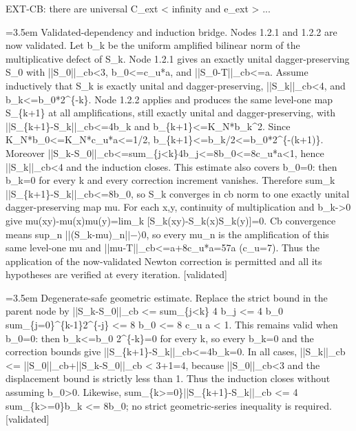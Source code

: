 \documentclass{article}
\newcommand{\step}[1]{\par\noindent\hangindent=3.5em\hangafter=1%
  \makebox[3.5em][l]{\textbf{#1.}}}
\newcommand{\steptag}[1]{\hfill{\small\textsf{[#1]}}}
\begin{document}
\begin{proofbox}{EXT-CB: there are universal C\_ext < infinity and e\_ext > ...}
\step{1.2.3.1} Validated-dependency and induction bridge. Nodes 1.2.1 and 1.2.2 are now validated. Let b\_k be the uniform amplified bilinear norm of the multiplicative defect of S\_k. Node 1.2.1 gives an exactly unital dagger-preserving S\_0 with ||S\_0||\_cb<3, b\_0<=c\_u*a, and ||S\_0-T||\_cb<=a. Assume inductively that S\_k is exactly unital and dagger-preserving, ||S\_k||\_cb<4, and b\_k<=b\_0*2\textasciicircum{}\{-k\}. Node 1.2.2 applies and produces the same level-one map S\_\{k+1\} at all amplifications, still exactly unital and dagger-preserving, with ||S\_\{k+1\}-S\_k||\_cb<=4b\_k and b\_\{k+1\}<=K\_N*b\_k\textasciicircum{}2. Since K\_N*b\_0<=K\_N*c\_u*a<=1/2, b\_\{k+1\}<=b\_k/2<=b\_0*2\textasciicircum{}\{-(k+1)\}. Moreover ||S\_k-S\_0||\_cb<=sum\_\{j<k\}4b\_j<=8b\_0<=8c\_u*a<1, hence ||S\_k||\_cb<4 and the induction closes. This estimate also covers b\_0=0: then b\_k=0 for every k and every correction increment vanishes. Therefore sum\_k ||S\_\{k+1\}-S\_k||\_cb<=8b\_0, so S\_k converges in cb norm to one exactly unital dagger-preserving map mu. For each x,y, continuity of multiplication and b\_k->0 give mu(xy)-mu(x)mu(y)=lim\_k [S\_k(xy)-S\_k(x)S\_k(y)]=0. Cb convergence means sup\_n ||(S\_k-mu)\_n|$|-\rangle$0, so every mu\_n is the amplification of this same level-one mu and ||mu-T||\_cb<=a+8c\_u*a=57a (c\_u=7). Thus the application of the now-validated Newton correction is permitted and all its hypotheses are verified at every iteration. \steptag{validated} \\[6pt]
\step{1.2.3.1.1} Degenerate-safe geometric estimate. Replace the strict bound in the parent node by ||S\_k-S\_0||\_cb <= sum\_\{j<k\} 4 b\_j <= 4 b\_0 sum\_\{j=0\}\textasciicircum{}\{k-1\}2\textasciicircum{}\{-j\} <= 8 b\_0 <= 8 c\_u a < 1. This remains valid when b\_0=0: then b\_k<=b\_0 2\textasciicircum{}\{-k\}=0 for every k, so every b\_k=0 and the correction bounds give ||S\_\{k+1\}-S\_k||\_cb<=4b\_k=0. In all cases, ||S\_k||\_cb <= ||S\_0||\_cb+||S\_k-S\_0||\_cb < 3+1=4, because ||S\_0||\_cb<3 and the displacement bound is strictly less than 1. Thus the induction closes without assuming b\_0>0. Likewise, sum\_\{k>=0\}||S\_\{k+1\}-S\_k||\_cb <= 4 sum\_\{k>=0\}b\_k <= 8b\_0; no strict geometric-series inequality is required. \steptag{validated} \\[4pt]

\end{proofbox}
\end{document}
